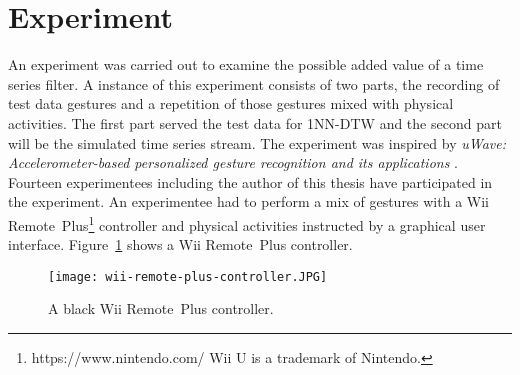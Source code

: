 \section{Experiment} \label{experiment}
An experiment was carried out to examine the possible added value of a time series filter. A instance of this experiment
consists of two parts, the recording of test data gestures and a repetition of those gestures mixed with physical
activities. The first part served the test data for 1NN-DTW and the second part will be the simulated time series
stream. The experiment was inspired by
\textit{uWave: Accelerometer-based personalized gesture recognition and its applications} \cite{liu2009uwave}. Fourteen
experimentees including the author of this thesis have participated in the experiment. An experimentee had to perform a
mix of gestures with a Wii
Remote\texttrademark~Plus\footnote{https://www.nintendo.com/ Wii U is a trademark of Nintendo.} controller and physical
activities instructed by a graphical user interface. Figure~\ref{fig:wii-remote} shows a Wii Remote\texttrademark~Plus
controller.
\begin{figure}
    \begin{center}
        \texttt{[image: wii-remote-plus-controller.JPG]}
    \end{center}
    \caption{A black Wii Remote\texttrademark~Plus controller.}
    \label{fig:wii-remote}
\end{figure}




